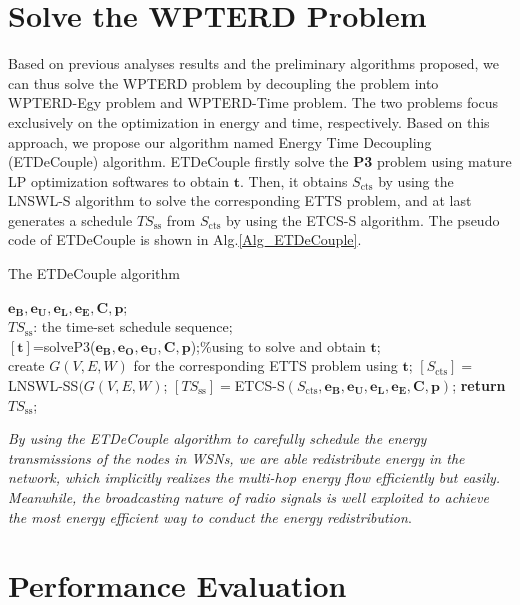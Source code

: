 \documentclass[journal,10pt]{IEEEtran}
\begin{document}
\section{Solve the WPTERD Problem}
\label{sec_algcombin}
Based on previous analyses results and the preliminary algorithms proposed, we can thus solve the WPTERD problem by decoupling the problem into WPTERD-Egy problem and WPTERD-Time problem. The two problems focus exclusively on the optimization in energy and time, respectively. Based on this approach, we propose our algorithm named Energy Time Decoupling (ETDeCouple) algorithm. ETDeCouple firstly solve the \textbf{P3} problem using mature LP optimization softwares to obtain $\mathbf{t}$. Then, it obtains $S_\text{cts}$ by using the LNSWL-S algorithm to solve the corresponding ETTS problem, and at last generates a schedule $TS_\text{ss}$ from $S_\text{cts}$ by using the ETCS-S algorithm. The pseudo code of ETDeCouple is shown in Alg.\ref{Alg_ETDeCouple}.

\begin{algorithm}[!htb]
\caption{The ETDeCouple algorithm}
\begin{algorithmic}[1]\label{Alg_ETDeCouple}
    \REQUIRE $\mathbf{e_B}, \mathbf{e_U}, \mathbf{e_L}, \mathbf{e_E}, \mathbf{C}, \mathbf{p}$;\\
    \ENSURE $TS_\text{ss}$: the time-set schedule sequence;\\
    \STATE $[\mathbf{t}]${=}solveP3($\mathbf{e_B}, \mathbf{e_O},\mathbf{e_U},\mathbf{C}, \mathbf{p}$);\%using  to solve and obtain $\mathbf{t}$;\\
    \STATE create $G(V,E,W)$ for the corresponding ETTS problem using $\mathbf{t}$;
    \STATE $[S_\text{cts}]{=}$LNSWL-SS$(G(V,E,W)$;
    \STATE $[TS_\text{ss}]{=}$ETCS-S$(S_\text{cts},\mathbf{e_B}, \mathbf{e_U}, \mathbf{e_L}, \mathbf{e_E}, \mathbf{C}, \mathbf{p})$;
     \STATE \textbf{return} $TS_\text{ss}$;
\end{algorithmic}
\end{algorithm}

\textit{By using the ETDeCouple algorithm to carefully schedule the energy transmissions of the nodes in WSNs, we are able redistribute energy in the network, which implicitly realizes the multi-hop energy flow efficiently but easily. Meanwhile, the broadcasting nature of radio signals is well exploited to achieve the most energy efficient way to conduct the energy redistribution}.

\section{Performance Evaluation}
\label{sec_sim}
\end{document}
